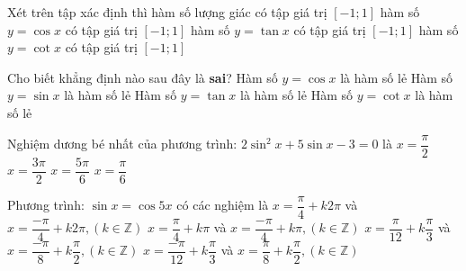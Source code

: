 \begin{ex}%
Xét trên tập xác định thì
	\choice
{hàm số lượng giác có tập giá trị $\left[-1;1\right]$}
{\True hàm số $y=\cos x$ có tập giá trị $\left[-1;1\right]$}
{hàm số $y=\tan x$ có tập giá trị $\left[-1;1\right]$}
{hàm số $y =\cot x$ có tập giá trị $\left[-1;1\right]$}
\end{ex}
\begin{ex}%
Cho biết khẳng định nào sau đây là \textbf{sai}?
	\choice
{\True Hàm số $y=\cos x$ là hàm số lẻ}
{Hàm số $y=\sin x$ là hàm số lẻ}
{Hàm số $y=\tan x$ là hàm số lẻ}
{Hàm số $y =\cot x$ là hàm số lẻ}
\end{ex}
\begin{ex}%
Nghiệm dương bé nhất của phương trình: $2\sin^2 x + 5\sin x -3 = 0$ là
	\choice
{$x=\dfrac{\pi}{2}$}
{$x=\dfrac{3\pi}{2}$}
{$x=\dfrac{5\pi}{6}$}
{\True $x=\dfrac{\pi}{6}$}
\end{ex}
\begin{ex}%
Phương trình: $\sin x =\cos 5x$ có các nghiệm là
	\choice
{$x=\dfrac{\pi}{4}+k2\pi$ và $x=\dfrac{-\pi}{4}+k2\pi , (k \in \mathbb{Z})$}
{$x=\dfrac{\pi}{4}+k\pi$ và $x=\dfrac{-\pi}{4}+k\pi , (k \in \mathbb{Z})$}
{\True $x=\dfrac{\pi}{12}+k\dfrac{\pi}{3}$ và $x=\dfrac{-\pi}{8}+k\dfrac{\pi}{2} , (k \in \mathbb{Z})$}
{$x=\dfrac{-\pi}{12}+k\dfrac{\pi}{3}$ và $x=\dfrac{\pi}{8}+k\dfrac{\pi}{2} , (k \in \mathbb{Z})$}
\end{ex}
